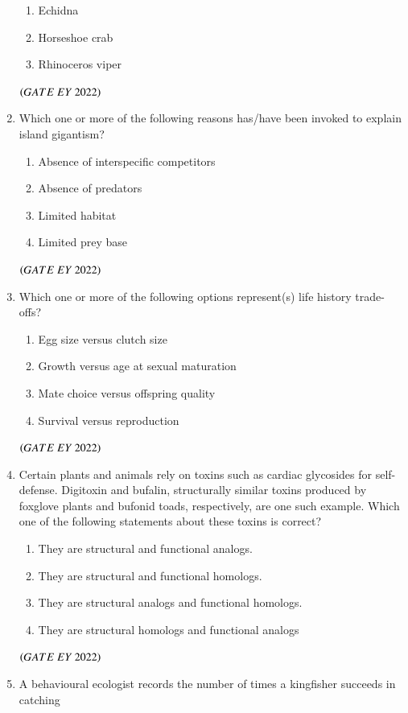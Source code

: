 \documentclass[journal]{IEEEtran}
\numberwithin{equation}{enumi}
\numberwithin{figure}{enumi}
\begin{document}
\begin{enumerate}
\begin{enumerate}
        \item  Echidna
        \item  Horseshoe crab
        \item  Rhinoceros viper
    \end{enumerate}
    \hfill{$\brak{ GATE\ EY\ 2022}$}
    \bigskip
 \item Which one or more of the following reasons has/have been invoked to explain
island gigantism?
    \begin{enumerate}
        \item  Absence of interspecific competitors
        \item  Absence of predators
        \item  Limited habitat
        \item  Limited prey base
    \end{enumerate}
    \hfill{$\brak{ GATE\ EY\ 2022}$}
    \bigskip
 \item Which one or more of the following options represent(s) life history trade-offs?
    \begin{enumerate}
        \item  Egg size versus clutch size
        \item  Growth versus age at sexual maturation
        \item  Mate choice versus offspring quality
        \item  Survival versus reproduction
    \end{enumerate}
    \hfill{$\brak{ GATE\ EY\ 2022}$}
    \bigskip
 \item Certain plants and animals rely on toxins such as cardiac glycosides for self-defense.
Digitoxin and bufalin, structurally similar toxins produced by foxglove plants and
bufonid toads, respectively, are one such example. Which one of the following
statements about these toxins is correct?
    \begin{enumerate}
        \item  They are structural and functional analogs.
        \item  They are structural and functional homologs.
        \item  They are structural analogs and functional homologs.
        \item  They are structural homologs and functional analogs
    \end{enumerate}
    \hfill{$\brak{ GATE\ EY\ 2022}$}
    \bigskip
 \item A behavioural ecologist records the number of times a kingfisher succeeds in catching

\end{enumerate}
\end{document}
